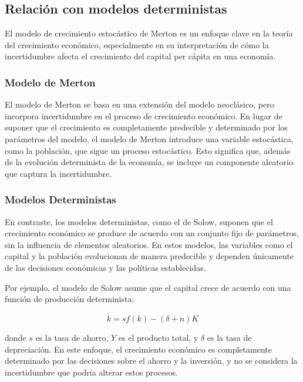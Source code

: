 \documentclass[a4paper,12pt]{article}
\begin{document}
	
	\subsection{Relación con modelos deterministas}
	
	El modelo de crecimiento estocástico de Merton es un enfoque clave en la teoría del crecimiento económico, especialmente en su interpretación de cómo la incertidumbre afecta el crecimiento del capital per cápita en una economía.
	
	\subsubsection{Modelo de Merton}
	El modelo de Merton se basa en una extensión del modelo neoclásico, pero incorpora incertidumbre en el proceso de crecimiento económico. En lugar de suponer que el crecimiento es completamente predecible y determinado por los parámetros del modelo, el modelo de Merton introduce una variable estocástica, como la población, que sigue un proceso estocástico. Esto significa que, además de la evolución determinista de la economía, se incluye un componente aleatorio que captura la incertidumbre.
	
	
	\subsubsection{Modelos Deterministas}
	En contraste, los modelos deterministas, como el de Solow, suponen que el crecimiento económico se produce de acuerdo con un conjunto fijo de parámetros, sin la influencia de elementos aleatorios. En estos modelos, las variables como el capital y la población evolucionan de manera predecible y dependen únicamente de las decisiones económicas y las políticas establecidas.
	
	Por ejemplo, el modelo de Solow asume que el capital crece de acuerdo con una función de producción determinista:
	
\begin{equation}
	\dot{k} = sf(k) - (\delta+n) K
\end{equation}
	
	donde \(s\) es la tasa de ahorro, \(Y\) es el producto total, y \(\delta\) es la tasa de depreciación. En este enfoque, el crecimiento económico es completamente determinado por las decisiones sobre el ahorro y la inversión, y no se considera la incertidumbre que podría alterar estos procesos.
	
\end{document}
